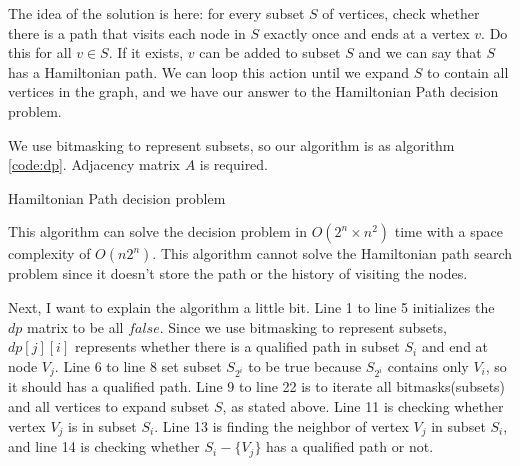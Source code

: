 \begin{solution}

    The idea of the solution is here: for every subset $S$ of vertices, check whether there is a path that visits each node in $S$ exactly once and ends at a vertex $v$. Do this for all $v \in S$. If it exists, $v$ can be added to subset $S$ and we can say that $S$ has a Hamiltonian path. We can loop this action until we expand $S$ to contain all vertices in the graph, and we have our answer to the Hamiltonian Path decision problem. 
    
    We use bitmasking to represent subsets, so our algorithm is as algorithm \ref{code:dp}. Adjacency matrix $A$ is required.
    
    \begin{algorithm}
    	\caption{Hamiltonian Path decision problem} 
    	\label{code:dp}
        \begin{algorithmic}[1]
        	\ENDFOR
    	\ENDFOR
    	\ENDFOR
    	                    \ENDIF
    	                \ENDIF
    	            \ENDFOR
    	        \ENDIF
    	   \ENDFOR
    	\ENDFOR
            \ENDIF
        \ENDFOR
        \end{algorithmic}
    \end{algorithm}

    This algorithm can solve the decision problem in $O(2^n \times n^2)$ time with a space complexity of $O(n2^n)$. This algorithm cannot solve the Hamiltonian path search problem since it doesn't store the path or the history of visiting the nodes. 
    
    Next, I want to explain the algorithm a little bit. Line 1 to line 5 initializes the $dp$ matrix to be all $false$. Since we use bitmasking to represent subsets, $dp[j][i]$ represents whether there is a qualified path in subset $S_i$ and end at node $V_j$. Line 6 to line 8 set subset $S_{2^i}$ to be true because $S_{2^i}$ contains only $V_i$, so it should has a qualified path. Line 9 to line 22 is to iterate all bitmasks(subsets) and all vertices to expand subset $S$, as stated above. Line 11 is checking whether vertex $V_j$ is in subset $S_i$. Line 13 is finding the neighbor of vertex $V_j$ in subset $S_i$, and line 14 is checking whether $S_i - \{V_j\}$ has a qualified path or not. 
    

\end{solution}
